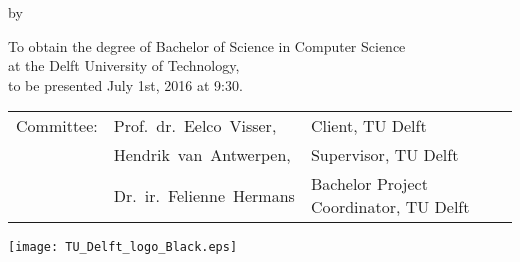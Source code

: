 \makecover

\begin{titlepage}
  \begin{center}
    {\makeatletter
    \largetitlestyle\fontsize{64}{94}\selectfont\@title
    \makeatother}

    {\makeatletter
    \ifx\@subtitle\undefined\else
        \bigskip
       {\tudsffamily\fontsize{22}{32}\selectfont\@subtitle}
    \fi
    \makeatother}

    \bigskip
    \bigskip

    by

    \bigskip
    \bigskip

    {\makeatletter
    \largetitlestyle\fontsize{26}{26}\selectfont\@author
    \makeatother}

    \bigskip
    \bigskip
    \vfill

    {\large
      To obtain the degree of Bachelor of Science in Computer
      Science\\
      at the Delft University of Technology,\\
      to be presented July 1st, 2016 at 9:30.
    }

    \bigskip
    \bigskip
    \vfill

    \begin{tabular}{lll}
      Committee: & Prof.~dr.~Eelco~Visser,   & Client, TU Delft \\
                 & Hendrik~van~Antwerpen,    & Supervisor, TU Delft \\
                 & Dr.~ir.~Felienne~Hermans  & Bachelor Project
                                               Coordinator, TU Delft
    \end{tabular}

    \vfill
    \texttt{[image: TU\_Delft\_logo\_Black.eps]}
  \end{center}
\end{titlepage}
